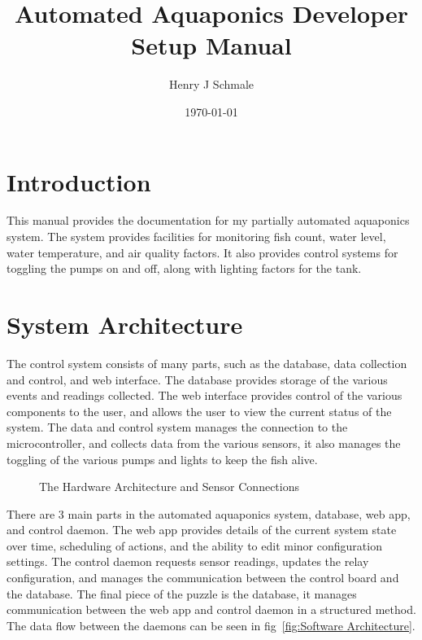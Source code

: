 \documentclass[american,12pt]{article}
\title{Automated Aquaponics Developer Setup Manual}
\author{Henry J Schmale}
\date{\today}
\begin{document}
\maketitle
\tableofcontents
\listoffigures

\newpage

\section{Introduction}
This manual provides the documentation for my partially automated aquaponics
system. The system provides facilities for monitoring fish count, water level,
water temperature, and air quality factors. It also provides control systems
for toggling the pumps on and off, along with lighting factors for the tank.

\section{System Architecture}
The control system consists of many parts, such as the database, data collection
and control, and web interface. The database provides storage of the various
events and readings collected. The web interface provides control of the various
components to the user, and allows the user to view the current status of the system.
The data and control system manages the connection to the microcontroller, and collects
data from the various sensors, it also manages the toggling of the various pumps and
lights to keep the fish alive.

\begin{figure}[h]
    \centering
    \caption{The Hardware Architecture and Sensor Connections}
    \label{fig:Hardware Architecture}
\end{figure}

There are 3 main parts in the automated aquaponics system, database,
web app, and control daemon. The web app provides details of the current
system state over time, scheduling of actions, and the ability to edit
minor configuration settings. The control daemon requests sensor readings,
updates the relay configuration, and manages the communication between the
control board and the database. The final piece of the puzzle is the
database, it manages communication between the web app and control daemon in
a structured method. The data flow between the daemons can be seen in 
fig~\ref{fig:Software Architecture}.
\end{document}
